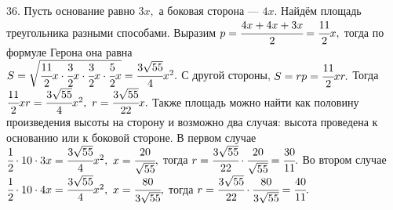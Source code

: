 36. Пусть основание равно $3x,$ а боковая сторона --- $4x.$ Найдём площадь треугольника разными способами. Выразим $p=\cfrac{4x+4x+3x}{2}=\cfrac{11}{2}x,$ тогда по формуле Герона она равна \\$S=\sqrt{\cfrac{11}{2}x\cdot\cfrac{3}{2}x\cdot \cfrac{3}{2}x\cdot \cfrac{5}{2}x}=\cfrac{3\sqrt{55}}{4}x^2.$ С другой стороны, $S=rp=\cfrac{11}{2}xr.$ Тогда $\cfrac{11}{2}xr=\cfrac{3\sqrt{55}}{4}x^2,\ r=\cfrac{3\sqrt{55}}{22}x.$ Также площадь можно найти как половину произведения высоты на сторону и возможно два случая: высота проведена к основанию или к боковой стороне. В первом случае $\cfrac{1}{2}\cdot10\cdot3x=\cfrac{3\sqrt{55}}{4}x^2,\ x=\cfrac{20}{\sqrt{55}},$ тогда $r=\cfrac{3\sqrt{55}}{22}\cdot\cfrac{20}{\sqrt{55}}=\cfrac{30}{11}.$ Во втором случае
$\cfrac{1}{2}\cdot10\cdot4x=\cfrac{3\sqrt{55}}{4}x^2,\ x=\cfrac{80}{3\sqrt{55}},$ тогда $r=\cfrac{3\sqrt{55}}{22}\cdot\cfrac{80}{3\sqrt{55}}=\cfrac{40}{11}.$\\
